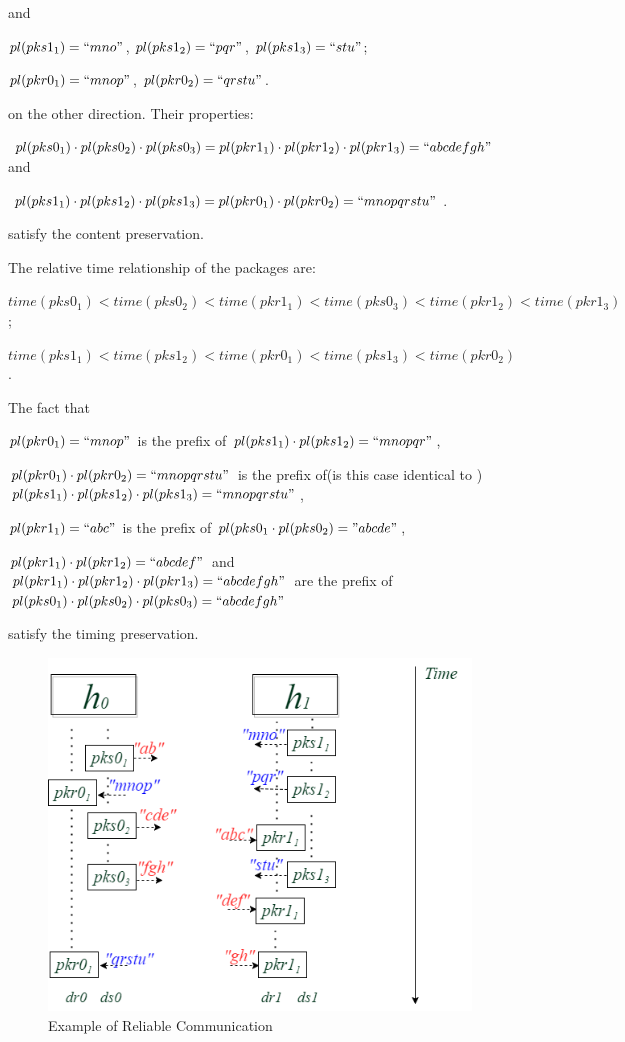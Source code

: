 and 

$pl(pks1_1)=``mno"$, $pl(pks1_2)=``pqr"$, $pl(pks1_3)=``stu"$;

$pl(pkr0_1)=``mnop"$, $pl(pkr0_2)=``qrstu"$. 

on the other direction. Their properties:

$pl(pks0_1) \cdot pl(pks0_2) \cdot pl(pks0_3) = pl(pkr1_1) \cdot pl(pkr1_2) \cdot pl(pkr1_3) = ``abcdefgh"$ and 

$pl(pks1_1) \cdot pl(pks1_2) \cdot pl(pks1_3) = pl(pkr0_1) \cdot pl(pkr0_2) = ``mnopqrstu"$. 

satisfy the content preservation. 

The relative time relationship of the packages are: 

$time(pks0_1) < time(pks0_2) < time(pkr1_1)< time(pks0_3) < time(pkr1_2) < time(pkr1_3) $;

$time(pks1_1) < time(pks1_2) < time(pkr0_1)< time(pks1_3) < time(pkr0_2)$. 

The fact that
 
$pl(pkr0_1) = ``mnop"$ is the prefix of $pl(pks1_1) \cdot  pl(pks1_2) = ``mnopqr"$,

$pl(pkr0_1) \cdot pl(pkr0_2)=``mnopqrstu"$ is the prefix of(is this case identical to ) $pl(pks1_1) \cdot pl(pks1_2) \cdot pl(pks1_3) = ``mnopqrstu" $,  

$pl(pkr1_1)=``abc"$ is the prefix of $pl(pks0_1 \cdot pl(pks0_2) = "abcde"$,  

$pl(pkr1_1) \cdot pl(pkr1_2)= ``abcdef"$ and  $pl(pkr1_1) \cdot pl(pkr1_2) \cdot pl(pkr1_3) = ``abcdefgh"$ are  the prefix of  $pl(pks0_1) \cdot pl(pks0_2) \cdot pl(pks0_3)= ``abcdefgh"$

satisfy the timing preservation. 

\begin{figure}[H]
\centerline{\includegraphics[scale=0.55]{Figures/reliableexample}}
\caption{Example of Reliable Communication}
\label{reliableexample}
\end{figure}

